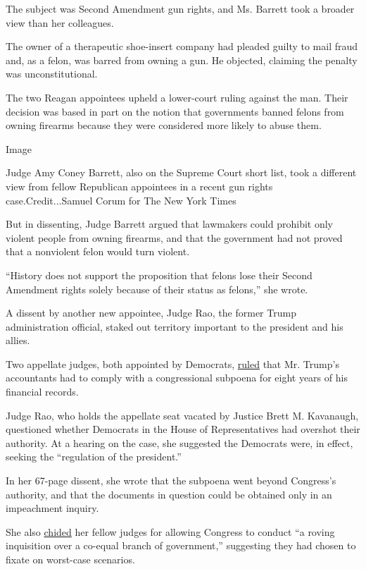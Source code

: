 The subject was Second Amendment gun rights, and Ms. Barrett took a
broader view than her colleagues.

The owner of a therapeutic shoe-insert company had pleaded guilty to
mail fraud and, as a felon, was barred from owning a gun. He objected,
claiming the penalty was unconstitutional.

The two Reagan appointees upheld a lower-court ruling against the man.
Their decision was based in part on the notion that governments banned
felons from owning firearms because they were considered more likely to
abuse them.

Image

Judge Amy Coney Barrett, also on the Supreme Court short list, took a
different view from fellow Republican appointees in a recent gun rights
case.Credit...Samuel Corum for The New York Times

But in dissenting, Judge Barrett argued that lawmakers could prohibit
only violent people from owning firearms, and that the government had
not proved that a nonviolent felon would turn violent.

``History does not support the proposition that felons lose their Second
Amendment rights solely because of their status as felons,'' she wrote.

A dissent by another new appointee, Judge Rao, the former Trump
administration official, staked out territory important to the president
and his allies.

Two appellate judges, both appointed by Democrats,
\href{https://www.nytimes.com/2019/10/11/us/politics/mazars-trump-tax-returns.html}{ruled}
that Mr. Trump's accountants had to comply with a congressional subpoena
for eight years of his financial records.

Judge Rao, who holds the appellate seat vacated by Justice Brett M.
Kavanaugh, questioned whether Democrats in the House of Representatives
had overshot their authority. At a hearing on the case, she suggested
the Democrats were, in effect, seeking the ``regulation of the
president.''

In her 67-page dissent, she wrote that the subpoena went beyond
Congress's authority, and that the documents in question could be
obtained only in an impeachment inquiry.

She also
\href{https://www.cadc.uscourts.gov/internet/opinions.nsf/20C16C3C5721030C85258490004DE33C/$file/19-5142-1810450.pdf}{chided}
her fellow judges for allowing Congress to conduct ``a roving
inquisition over a co-equal branch of government,'' suggesting they had
chosen to fixate on worst-case scenarios.

